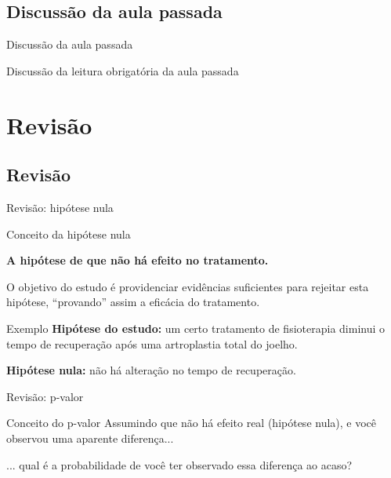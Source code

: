 \documentclass{beamer}
\begin{document}
\subsection{Discussão da aula passada}

\begin{frame}{Discussão da aula passada}
  \begin{block}{}
    Discussão da leitura obrigatória da aula passada
  \end{block}
\end{frame}

\section{Revisão}

\subsection{Revisão}

\begin{frame}{Revisão: hipótese nula}
  \begin{block}{Conceito da hipótese nula}
    \begin{center}
      {\bf A hipótese de que não há efeito no tratamento.}
    \end{center}

    \bigskip
    \small
    O objetivo do estudo é providenciar evidências suficientes para rejeitar esta hipótese, ``provando'' assim a eficácia do tratamento.
  \end{block}
  \begin{exampleblock}{Exemplo}
    \small
    {\bf Hipótese do estudo:} um certo tratamento de fisioterapia diminui o tempo de recuperação após uma artroplastia total do joelho.

    \bigskip
    {\bf Hipótese nula:} não há alteração no tempo de recuperação.
  \end{exampleblock}
\end{frame}

\begin{frame}{Revisão: p-valor}
  \begin{block}{Conceito do p-valor}
    Assumindo que não há efeito real (hipótese nula), e você observou uma aparente diferença...

    \bigskip
    \begin{block}{}
      ... qual é a probabilidade de você ter observado essa diferença ao acaso?
    \end{block}
  \end{block}
\end{frame}
\end{document}
